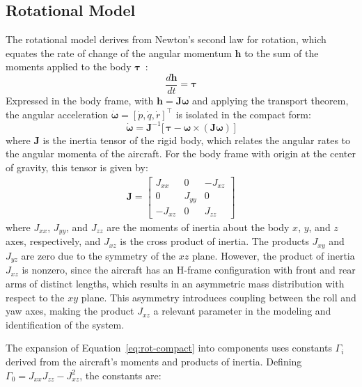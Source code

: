 \documentclass{ieeeaccess}
\begin{document}
\subsection{Rotational Model}

The rotational model derives from Newton's second law for rotation, which equates the rate of change of the angular momentum $\mathbf{h}$ to the sum of the moments applied to the body $\boldsymbol{\tau}$~\cite{cBeard}:
\begin{equation}
\frac{d\mathbf{h}}{dt} = \boldsymbol{\tau}
\label{eq:rot-newton}
\end{equation}
Expressed in the body frame, with $\mathbf{h} = \mathbf{J}\boldsymbol{\omega}$ and applying the transport theorem, the angular acceleration $\dot{\boldsymbol{\omega}} = [\dot{p}, \dot{q}, \dot{r}]^{\top}$ is isolated in the compact form:
\begin{equation}
\dot{\boldsymbol{\omega}} = \mathbf{J}^{-1}\big[\,\boldsymbol{\tau} - \boldsymbol{\omega} \times (\mathbf{J}\boldsymbol{\omega})\,\big]
\label{eq:rot-compact}
\end{equation}
where $\mathbf{J}$ is the inertia tensor of the rigid body, which relates the angular rates to the angular momenta of the aircraft. For the body frame with origin at the center of gravity, this tensor is given by:
\begin{align}
\mathbf{J} = \begin{bmatrix}
J_{xx} & 0 & -J_{xz} \\
0 & J_{yy} & 0 \\
-J_{xz} & 0 & J_{zz}
\end{bmatrix}
\end{align}
where $J_{xx}$, $J_{yy}$, and $J_{zz}$ are the moments of inertia about the body $x$, $y$, and $z$ axes, respectively, and $J_{xz}$ is the cross product of inertia. The products $J_{xy}$ and $J_{yz}$ are zero due to the symmetry of the $xz$ plane. However, the product of inertia $J_{xz}$ is nonzero, since the aircraft has an H-frame configuration with front and rear arms of distinct lengths, which results in an asymmetric mass distribution with respect to the $xy$ plane. This asymmetry introduces coupling between the roll and yaw axes, making the product $J_{xz}$ a relevant parameter in the modeling and identification of the system.

The expansion of Equation~\eqref{eq:rot-compact} into components uses constants $\Gamma_i$ derived from the aircraft's moments and products of inertia. Defining $\Gamma_0 = J_{xx} J_{zz} - J_{xz}^2$, the constants are:
\end{document}
